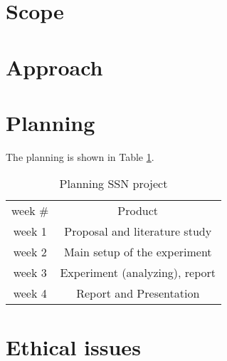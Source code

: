 \documentclass[journal]{IEEEtran}
\begin{document}
\section{Scope}


\section{Approach}



\section{Planning}
The planning is shown in Table \ref{tab:plan}.
\begin{table}[H]
    \centering
\begin{tabular}{ | c | c }
\cellcolor[gray]{0.7} week  \# 	&\cellcolor[gray]{0.7} Product\\
\cellcolor[gray]{0.9} week 1 	& Proposal and literature study  \\
\cellcolor[gray]{0.9} week 2 	& Main setup of the experiment  \\
\cellcolor[gray]{0.9} week 3 	& Experiment (analyzing), report  \\
\cellcolor[gray]{0.9} week 4 	& Report and Presentation  \\
\end{tabular}
    \caption{Planning SSN project}
    \label{tab:plan}
\end{table}


\section{Ethical issues}


\nocite{*}
\printbibliography
\end{document}
